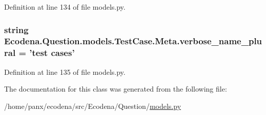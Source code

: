 Definition at line 134 of file models.py.

\hypertarget{class_ecodena_1_1_question_1_1models_1_1_test_case_1_1_meta_a5d437326b1d427e4225daeb42b308535}{
\subsubsection[{verbose\_\-name\_\-plural}]{\setlength{\rightskip}{0pt plus 5cm}string {\bf Ecodena.Question.models.TestCase.Meta.verbose\_\-name\_\-plural} = 'test cases'}}
\label{d7/de8/class_ecodena_1_1_question_1_1models_1_1_test_case_1_1_meta_a5d437326b1d427e4225daeb42b308535}


Definition at line 135 of file models.py.



The documentation for this class was generated from the following file:\begin{DoxyCompactItemize}
\item 
/home/panx/ecodena/src/Ecodena/Question/\hyperlink{_question_2models_8py}{models.py}\end{DoxyCompactItemize}

